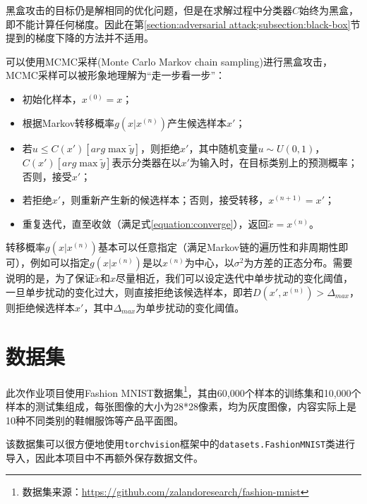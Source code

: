 \documentclass[journal, a4paper]{IEEEtran}
\begin{document}
黑盒攻击的目标仍是解相同的优化问题，但是在求解过程中分类器$C$始终为黑盒，即不能计算任何梯度。因此在第\ref{section:adversarial attack;subsection:black-box}节提到的梯度下降的方法并不适用。

可以使用MCMC采样(Monte Carlo Markov chain sampling)进行黑盒攻击，MCMC采样可以被形象地理解为``走一步看一步''：

\begin{itemize}
    \item 初始化样本，$x^{(0)}=x$；
    \item 根据Markov转移概率$g(x|x^{(n)})$产生候选样本$x'$；
    \item 若$u\le C(x')[arg\max \tilde y]$，则拒绝$x'$，其中随机变量$u\sim U(0,1)$，$C(x')[arg\max \tilde y]$表示分类器在以$x'$为输入时，在目标类别上的预测概率；否则，接受$x'$；
    \item 若拒绝$x'$，则重新产生新的候选样本；否则，接受转移，$x^{(n+1)}=x'$；
    \item 重复迭代，直至收敛（满足式\ref{equation:converge}），返回$\tilde x=x^{(n)}$。
\end{itemize}

转移概率$g(x|x^{(n)})$基本可以任意指定（满足Markov链的遍历性和非周期性即可），例如可以指定$g(x|x^{(n)})$是以$x^{(n)}$为中心，以$\sigma^2$为方差的正态分布。需要说明的是，为了保证$\tilde x$和$x$尽量相近，我们可以设定迭代中单步扰动的变化阈值，一旦单步扰动的变化过大，则直接拒绝该候选样本，即若$D(x',x^{(n)})>\Delta_{max}$，则拒绝候选样本$x'$，其中$\Delta_{max}$为单步扰动的变化阈值。

\section{\textbf{数据集}}
\label{section:dataset}

此次作业项目使用Fashion MNIST数据集\footnote{数据集来源：\url{https://github.com/zalandoresearch/fashion-mnist}}，其由60,000个样本的训练集和10,000个样本的测试集组成，每张图像的大小为28*28像素，均为灰度图像，内容实际上是10种不同类别的鞋帽服饰等产品平面图。

该数据集可以很方便地使用\verb|torchvision|框架中的\verb|datasets.FashionMNIST|类进行导入，因此本项目中不再额外保存数据文件。
\end{document}
